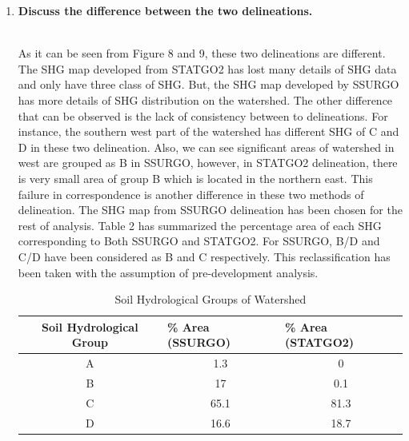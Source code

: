 \documentclass[letterpaper,12pt]{article}
\begin{document}
\begin{enumerate}
	~\item \textbf{Discuss the difference between the two delineations.}\\~
	
	As it can be seen from Figure 8 and 9, these two delineations are different. The SHG map developed from STATGO2 has lost many details of SHG data and only have three class of SHG. But, the SHG map developed by SSURGO has more details of SHG distribution on the watershed. The other difference that can be observed is the lack of consistency between to delineations. For instance, the southern west part of the watershed has different SHG of C and D in these two delineation. Also, we can see significant areas of watershed in west are grouped as B in SSURGO, however, in STATGO2 delineation, there is very small area of group B which is located in the northern east. This failure in correspondence is another difference in these two methods of delineation.
	The SHG map from SSURGO delineation has been chosen for the rest of analysis.
	Table 2 has summarized the percentage area of each SHG corresponding to Both SSURGO and STATGO2. For SSURGO, B/D and C/D have been considered as B and C respectively. This reclassification has been taken with the assumption of pre-development analysis.
	
	\begin{table}[H]
		\centering
		\caption{Soil Hydrological Groups of Watershed}
		\label{my-label}
		\begin{tabular}{|c|c|c|}
			\hline
			Soil Hydrological Group & \multicolumn{1}{l|}{\% Area (SSURGO)} & \multicolumn{1}{l|}{\% Area (STATGO2)} \\ \hline
			A & 1.3 & 0 \\ \hline
			B & 17 & 0.1 \\ \hline
			C & 65.1 & 81.3 \\ \hline
			D & 16.6 & 18.7 \\ \hline
		\end{tabular}
	\end{table}
	
	
	
\end{enumerate}

\newpage
\end{document}
